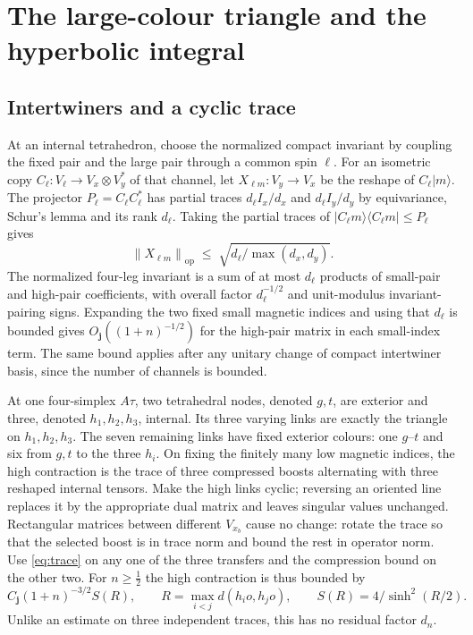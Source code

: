 \documentclass[11pt]{article}
\theoremstyle{remark}
\newcommand{\op}{\mathrm{op}}
\newcommand{\norm}[1]{\left\lVert #1\right\rVert}
\begin{document}
\section{The large-colour triangle and the hyperbolic integral}
\subsection{Intertwiners and a cyclic trace}
At an internal tetrahedron, choose the normalized compact invariant by coupling the fixed pair and the large pair through a common spin \(\ell\). For an isometric copy \(C_\ell:V_\ell\to V_x\otimes V_y^*\) of that channel, let \(X_{\ell m}:V_y\to V_x\) be the reshape of \(C_\ell|m\rangle\). The projector \(P_\ell=C_\ell C_\ell^*\) has partial traces \(d_\ell I_x/d_x\) and \(d_\ell I_y/d_y\) by equivariance, Schur's lemma and its rank \(d_\ell\). Taking the partial traces of \(\lvert C_\ell m\rangle\langle C_\ell m\rvert\le P_\ell\) gives
\[
 \norm{X_{\ell m}}_{\op}\;\le\;
 \sqrt{d_\ell/\max(d_x,d_y)} .
\]
The normalized four-leg invariant is a sum of at most \(d_\ell\) products of small-pair and high-pair coefficients, with overall factor \(d_\ell^{-1/2}\) and unit-modulus invariant-pairing signs. Expanding the two fixed small magnetic indices and using that \(d_\ell\) is bounded gives \(O_{\boldsymbol j}((1+n)^{-1/2})\) for the high-pair matrix in each small-index term. The same bound applies after any unitary change of compact intertwiner basis, since the number of channels is bounded.

At one four-simplex \(A\tau\), two tetrahedral nodes, denoted \(g,t\), are exterior and three, denoted \(h_1,h_2,h_3\), internal. Its three varying links are exactly the triangle on \(h_1,h_2,h_3\). The seven remaining links have fixed exterior colours: one \(g\)--\(t\) and six from \(g,t\) to the three \(h_i\). On fixing the finitely many low magnetic indices, the high contraction is the trace of three compressed boosts alternating with three reshaped internal tensors. Make the high links cyclic; reversing an oriented line replaces it by the appropriate dual matrix and leaves singular values unchanged. Rectangular matrices between different \(V_{x_b}\) cause no change: rotate the trace so that the selected boost is in trace norm and bound the rest in operator norm. Use \eqref{eq:trace} on any one of the three transfers and the compression bound on the other two. For \(n\ge\tfrac12\) the high contraction is thus bounded by
\begin{equation}\label{eq:atvertex}
 C_{\boldsymbol j}(1+n)^{-3/2}S(R),\qquad
 R=\max_{i<j}d(h_io,h_jo),\qquad S(R)=4/\sinh^2(R/2).
\end{equation}
Unlike an estimate on three independent traces, this has no residual factor \(d_n\).
\end{document}
